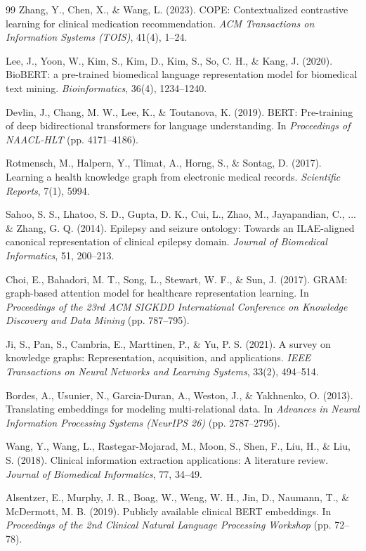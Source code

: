 \documentclass[11pt,a4paper]{article}
\begin{document}
\begin{table}[t]
\begin{thebibliography}{99}
Zhang, Y., Chen, X., \& Wang, L. (2023). COPE: Contextualized contrastive learning for clinical medication recommendation. \emph{ACM Transactions on Information Systems (TOIS)}, 41(4), 1--24.

Lee, J., Yoon, W., Kim, S., Kim, D., Kim, S., So, C. H., \& Kang, J. (2020). BioBERT: a pre-trained biomedical language representation model for biomedical text mining. \emph{Bioinformatics}, 36(4), 1234--1240.

Devlin, J., Chang, M. W., Lee, K., \& Toutanova, K. (2019). BERT: Pre-training of deep bidirectional transformers for language understanding. In \emph{Proceedings of NAACL-HLT} (pp. 4171--4186).

Rotmensch, M., Halpern, Y., Tlimat, A., Horng, S., \& Sontag, D. (2017). Learning a health knowledge graph from electronic medical records. \emph{Scientific Reports}, 7(1), 5994.

Sahoo, S. S., Lhatoo, S. D., Gupta, D. K., Cui, L., Zhao, M., Jayapandian, C., ... \& Zhang, G. Q. (2014). Epilepsy and seizure ontology: Towards an ILAE-aligned canonical representation of clinical epilepsy domain. \emph{Journal of Biomedical Informatics}, 51, 200--213.

Choi, E., Bahadori, M. T., Song, L., Stewart, W. F., \& Sun, J. (2017). GRAM: graph-based attention model for healthcare representation learning. In \emph{Proceedings of the 23rd ACM SIGKDD International Conference on Knowledge Discovery and Data Mining} (pp. 787--795).

Ji, S., Pan, S., Cambria, E., Marttinen, P., \& Yu, P. S. (2021). A survey on knowledge graphs: Representation, acquisition, and applications. \emph{IEEE Transactions on Neural Networks and Learning Systems}, 33(2), 494--514.

Bordes, A., Usunier, N., Garcia-Duran, A., Weston, J., \& Yakhnenko, O. (2013). Translating embeddings for modeling multi-relational data. In \emph{Advances in Neural Information Processing Systems (NeurIPS 26)} (pp. 2787--2795).

Wang, Y., Wang, L., Rastegar-Mojarad, M., Moon, S., Shen, F., Liu, H., \& Liu, S. (2018). Clinical information extraction applications: A literature review. \emph{Journal of Biomedical Informatics}, 77, 34--49.

Alsentzer, E., Murphy, J. R., Boag, W., Weng, W. H., Jin, D., Naumann, T., \& McDermott, M. B. (2019). Publicly available clinical BERT embeddings. In \emph{Proceedings of the 2nd Clinical Natural Language Processing Workshop} (pp. 72--78).


\end{thebibliography}
\end{table}
\end{document}
